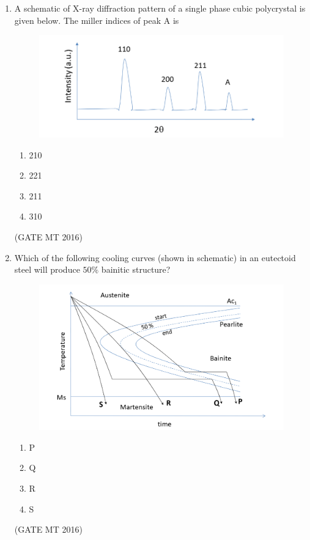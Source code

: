 \documentclass[journal, 11pt, onecolumn]{IEEEtran}
\theoremstyle{remark}
\begin{document}
\begin{enumerate}
\item A schematic of X-ray diffraction pattern of a single phase cubic polycrystal is given below. The miller indices of peak A is

\begin{figure}[H]
    \centering
    \includegraphics[width=0.5\linewidth]{figs/image1'.png}
    \caption{}
    \label{fig:placeholder}
\end{figure}

\begin{multicols}{2}
\begin{enumerate}
\item 210
\item 221
\item 211
\item 310
\end{enumerate}
\end{multicols}
\hfill(GATE MT 2016)

\item Which of the following cooling curves (shown in schematic) in an eutectoid steel will produce $50\%$ bainitic structure?

\begin{figure}[H]
    \centering
    \includegraphics[width=0.5\linewidth]{figs/image2'.png}
    \label{fig:placeholder}
\end{figure}

\begin{multicols}{4}
\begin{enumerate}
\item P
\item Q
\item R
\item S
\end{enumerate}
\end{multicols}
\hfill(GATE MT 2016)


\end{enumerate}
\end{document}
